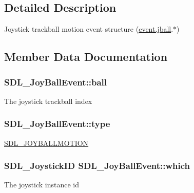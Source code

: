 \subsection{Detailed Description}
Joystick trackball motion event structure (\hyperlink{unionSDL__Event_ae433f511e3383d17f8fe02df745ee8f8}{event.\+jball}.$\ast$) 

\subsection{Member Data Documentation}
\hypertarget{structSDL__JoyBallEvent_add4eb0daeaf95ae56e8c7cfcec560242}{}
\subsubsection[{ball}]{ S\+D\+L\+\_\+\+Joy\+Ball\+Event\+::ball}\label{structSDL__JoyBallEvent_add4eb0daeaf95ae56e8c7cfcec560242}
The joystick trackball index \hypertarget{structSDL__JoyBallEvent_a0b192b95a043cb494b27ed9b27e84db1}{}
\subsubsection[{type}]{ S\+D\+L\+\_\+\+Joy\+Ball\+Event\+::type}\label{structSDL__JoyBallEvent_a0b192b95a043cb494b27ed9b27e84db1}
\hyperlink{SDL__events_8h_a3b589e89be6b35c02e0dd34a55f3fccaa78f859489cfd565c305c7f6f9d5b25c1}{S\+D\+L\+\_\+\+J\+O\+Y\+B\+A\+L\+L\+M\+O\+T\+I\+O\+N} \hypertarget{structSDL__JoyBallEvent_a4e2e185717d529167cd0bea21093c454}{}
\subsubsection[{which}]{\setlength{\rightskip}{0pt plus 5cm}S\+D\+L\+\_\+\+Joystick\+I\+D S\+D\+L\+\_\+\+Joy\+Ball\+Event\+::which}\label{structSDL__JoyBallEvent_a4e2e185717d529167cd0bea21093c454}
The joystick instance id \hypertarget{structSDL__JoyBallEvent_a959a8473aa1964e5e1778c27a9ffd261}{}
